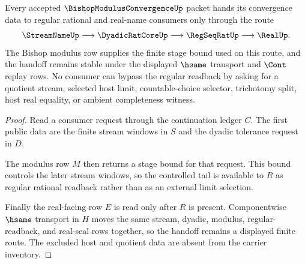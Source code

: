 \begin{theorem}
\label{thm:bishop-modulus-convergence-regular-handoff}
Every accepted $\BishopModulusConvergenceUp$ packet hands its convergence data to regular rational and real-name consumers only through the route
$$
\StreamNameUp \longrightarrow \DyadicRatCoreUp \longrightarrow \RegSeqRatUp \longrightarrow \RealUp .
$$
The Bishop modulus row supplies the finite stage bound used on this route, and the handoff remains stable under the displayed $\hsame$ transport and $\Cont$ replay rows. No consumer can bypass the regular readback by asking for a quotient stream, selected host limit, countable-choice selector, trichotomy split, host real equality, or ambient completeness witness.
\end{theorem}
\begin{proof}
Read a consumer request through the continuation ledger $C$. The first public data are the finite stream windows in $S$ and the dyadic tolerance request in $D$.

The modulus row $M$ then returns a stage bound for that request. This bound controls the later stream windows, so the controlled tail is available to $R$ as regular rational readback rather than as an external limit selection.

Finally the real-facing row $E$ is read only after $R$ is present. Componentwise $\hsame$ transport in $H$ moves the same stream, dyadic, modulus, regular-readback, and real-seal rows together, so the handoff remains a displayed finite route. The excluded host and quotient data are absent from the carrier inventory.
\end{proof}


